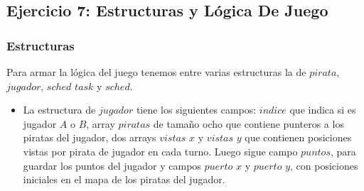 \subsection{Ejercicio 7: Estructuras y Lógica De Juego}
\subsubsection{Estructuras}


Para armar la lógica del juego tenemos entre varias estructuras la de $pirata$, $jugador$, $sched$ $task$ y $sched$.
\begin{itemize}
\item La estructura de $jugador$ tiene los siguientes campos: $indice$ que indica si es jugador $A$ o $B$, 
array $piratas$ de tamaño ocho que contiene punteros a los piratas del jugador, dos arrays $vistas$ $x$ y
$vistas$ $y$ que contienen posiciones vistas por pirata de jugador en cada turno. Luego sigue campo
$puntos$, para guardar los puntos del jugador y campos $puerto$ $x$ y $puerto$ $y$, con posiciones iniciales
en el mapa de los piratas del jugador.\\


\end{itemize}
